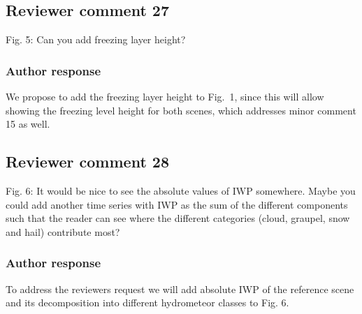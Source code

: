 \documentclass[11pt]{scrartcl}
\begin{document}
\subsection*{Reviewer comment 27}
Fig. 5: Can you add freezing layer height?

\subsubsection*{Author response}

We propose to add the freezing layer height to Fig.~1, since this will
allow showing the freezing level height for both scenes, which 
addresses minor comment 15 as well.

%


\subsection*{Reviewer comment 28}
Fig.  6:  It would be nice to see the absolute values of IWP somewhere.  Maybe you could add another time series with IWP as the sum of the different components such that the reader can see where the different categories (cloud, graupel, snow and hail) contribute most?

\subsubsection*{Author response}

To address the reviewers request we will add absolute IWP of the reference scene
and its decomposition into different hydrometeor classes to Fig. 6.

%
\end{document}
